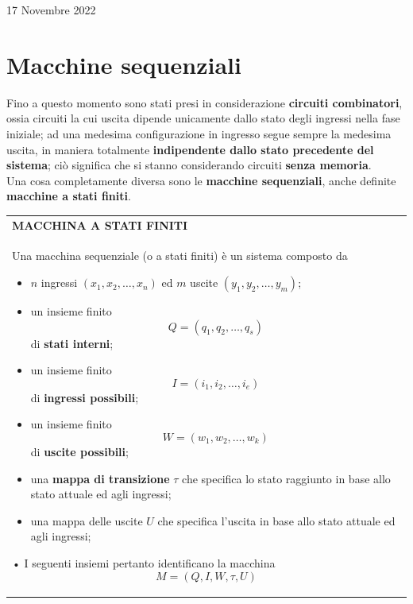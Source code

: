 \documentclass[a4paper]{extarticle}
\renewcommand\arraystretch{}
\begin{document}
\newpage
\begin{center}
    17 Novembre 2022
\end{center}
\noindent
\section{Macchine sequenziali}
Fino a questo momento sono stati presi in considerazione \textbf{circuiti combinatori}, ossia circuiti la cui uscita dipende unicamente dallo stato degli ingressi nella fase iniziale; ad una medesima configurazione in ingresso segue sempre la medesima uscita, in maniera totalmente \textbf{indipendente dallo stato precedente del sistema}; ciò significa che si stanno considerando circuiti \textbf{senza memoria}.\\
Una cosa completamente diversa sono le \textbf{macchine sequenziali}, anche definite \textbf{macchine a stati finiti}.

\vspace{1em}
\setlength{\tabcolsep}{14pt}
\renewcommand{\arraystretch}{2}
\noindent
\begin{tabularx}{\textwidth}{@{}|P|@{}}
    \hline
    {\textbf{MACCHINA A STATI FINITI}}\\
    \parbox{\linewidth}{Una macchina sequenziale (o a stati finiti) è un sistema composto da
    \begin{itemize}
        \item $n$ ingressi $(x_1,x_2,\dots,x_n)$ ed $m$ uscite $(y_1,y_2,\dots,y_m)$;
        \item un insieme finito
        \[Q=(q_1,q_2,\dots,q_s)\]
        di \textbf{stati interni};
        \item un insieme finito
        \[I=(i_1,i_2,\dots,i_e)\]
        di \textbf{ingressi possibili};
        \item un insieme finito
        \[W=(w_1,w_2,\dots,w_k)\]
        di \textbf{uscite possibili};
        \item una \textbf{mappa di transizione} $\tau$ che specifica lo stato raggiunto in base allo stato attuale ed agli ingressi;
        \item una mappa delle uscite $U$ che specifica l'uscita in base allo stato attuale ed agli ingressi;
    \end{itemize}
    • I seguenti insiemi pertanto identificano la macchina
    \[M = (Q,I,W,\tau,U)\]    
    \vspace{-1mm}}\\
    \hline
\end{tabularx}
\end{document}
